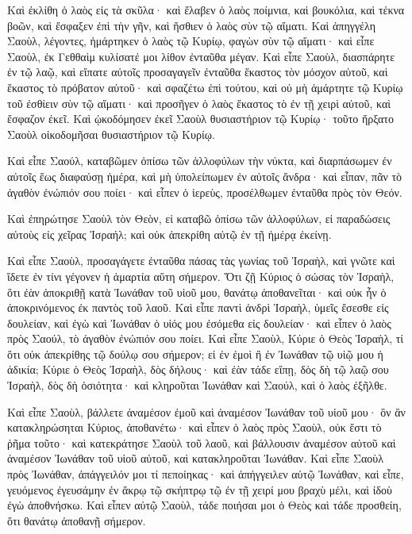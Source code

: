 {Καὶ ἐκλίθη ὁ λαὸς εἰς τὰ σκῦλα· καὶ ἔλαβεν ὁ λαὸς ποίμνια, καὶ βουκόλια, καὶ τέκνα βοῶν, καὶ ἔσφαξεν ἐπὶ τὴν γῆν, καὶ ἤσθιεν ὁ λαὸς σὺν τῷ αἵματι.
Καὶ ἀπηγγέλη Σαοὺλ, λέγοντες, ἡμάρτηκεν ὁ λαὸς τῷ Κυρίῳ, φαγὼν σὺν τῷ αἵματι· καὶ εἶπε Σαοὺλ, ἐκ Γεθθαὶμ κυλίσατέ μοι λίθον ἐνταῦθα μέγαν.
Καὶ εἶπε Σαοὺλ, διασπάρητε ἐν τῷ λαῷ, καὶ εἴπατε αὐτοῖς προσαγαγεῖν ἐνταῦθα ἕκαστος τὸν μόσχον αὑτοῦ, καὶ ἕκαστος τὸ πρόβατον αὑτοῦ· καὶ σφαζέτω ἐπὶ τούτου, καὶ οὐ μὴ ἁμάρτητε τῷ Κυρίῳ τοῦ ἐσθίειν σὺν τῷ αἵματι· καὶ προσῆγεν ὁ λαὸς ἕκαστος τὸ ἐν τῇ χειρὶ αὐτοῦ, καὶ ἔσφαζον ἐκεῖ.
Καὶ ᾠκοδόμησεν ἐκεῖ Σαοὺλ θυσιαστήριον τῷ Κυρίῳ· τοῦτο ἤρξατο Σαοὺλ οἰκοδομῆσαι θυσιαστήριον τῷ Κυρίῳ.
\par }{\PP {}Καὶ εἶπε Σαούλ, καταβῶμεν ὀπίσω τῶν ἀλλοφύλων τὴν νύκτα, καὶ διαρπάσωμεν ἐν αὐτοῖς ἕως διαφαύσῃ ἡμέρα, καὶ μὴ ὑπολείπωμεν ἐν αὐτοῖς ἄνδρα· καὶ εἶπαν, πᾶν τὸ ἀγαθὸν ἐνώπιόν σου ποίει· καὶ εἶπεν ὁ ἱερεὺς, προσέλθωμεν ἐνταῦθα πρὸς τὸν Θεόν.
\par }{\PP {}Καὶ ἐπηρώτησε Σαοὺλ τὸν Θεὸν, εἰ καταβῶ ὀπίσω τῶν ἀλλοφύλων, εἰ παραδώσεις αὐτοὺς εἰς χεῖρας Ἰσραήλ; καὶ οὐκ ἀπεκρίθη αὐτῷ ἐν τῇ ἡμέρᾳ ἐκείνῃ.
\par }{\PP {}Καὶ εἶπε Σαοὺλ, προσαγάγετε ἐνταῦθα πάσας τὰς γωνίας τοῦ Ἰσραὴλ, καὶ γνῶτε καὶ ἴδετε ἐν τίνι γέγονεν ἡ ἁμαρτία αὕτη σήμερον.
Ὅτι ζῇ Κύριος ὁ σώσας τὸν Ἰσραὴλ, ὅτι ἐὰν ἀποκριθῇ κατὰ Ἰωνάθαν τοῦ υἱοῦ μου, θανάτῳ ἀποθανεῖται· καὶ οὐκ ἦν ὁ ἀποκρινόμενος ἐκ παντὸς τοῦ λαοῦ.
Καὶ εἶπε παντὶ ἀνδρὶ Ἰσραὴλ, ὑμεῖς ἔσεσθε εἰς δουλείαν, καὶ ἐγὼ καὶ Ἰωνάθαν ὁ υἱός μου ἐσόμεθα εἰς δουλείαν· καὶ εἶπεν ὁ λαὸς πρὸς Σαούλ, τὸ ἀγαθὸν ἐνώπιόν σου ποίει.
Καὶ εἶπε Σαοὺλ, Κύριε ὁ Θεὸς Ἰσραὴλ, τί ὅτι οὐκ ἀπεκρίθης τῷ δούλῳ σου σήμερον; εἰ ἐν ἐμοὶ ἢ ἐν Ἰωνάθαν τῷ υἱῷ μου ἡ ἀδικία; Κύριε ὁ Θεὸς Ἰσραὴλ, δὸς δήλους· καὶ ἐὰν τάδε εἴπῃ, δὸς δὴ τῷ λαῷ σου Ἰσραὴλ, δὸς δὴ ὁσιότητα· καὶ κληροῦται Ἰωνάθαν καὶ Σαούλ, καὶ ὁ λαὸς ἐξῆλθε.
\par }{\PP {}Καὶ εἶπε Σαοὺλ, βάλλετε ἀναμέσον ἐμοῦ καὶ ἀναμέσον Ἰωνάθαν τοῦ υἱοῦ μου· ὃν ἂν κατακληρώσηται Κύριος, ἀποθανέτω· καὶ εἶπεν ὁ λαὸς πρὸς Σαοὺλ, οὐκ ἔστι τὸ ῥῆμα τοῦτο· καὶ κατεκράτησε Σαοὺλ τοῦ λαοῦ, καὶ βάλλουσιν ἀναμέσον αὐτοῦ καὶ ἀναμέσον Ἰωνάθαν τοῦ υἱοῦ αὐτοῦ, καὶ κατακληροῦται Ἰωνάθαν.
Καὶ εἶπε Σαοὺλ πρὸς Ἰωνάθαν, ἀπάγγειλόν μοι τί πεποίηκας· καὶ ἀπήγγειλεν αὐτῷ Ἰωνάθαν, καὶ εἶπε, γευόμενος ἐγευσάμην ἐν ἄκρῳ τῷ σκήπτρῳ τῷ ἐν τῇ χειρί μου βραχὺ μέλι, καὶ ἰδοὺ ἐγὼ ἀποθνήσκω.
Καὶ εἶπεν αὐτῷ Σαοὺλ, τάδε ποιήσαι μοι ὁ Θεὸς καὶ τάδε προσθείη, ὅτι θανάτῳ ἀποθανῇ σήμερον.
}
